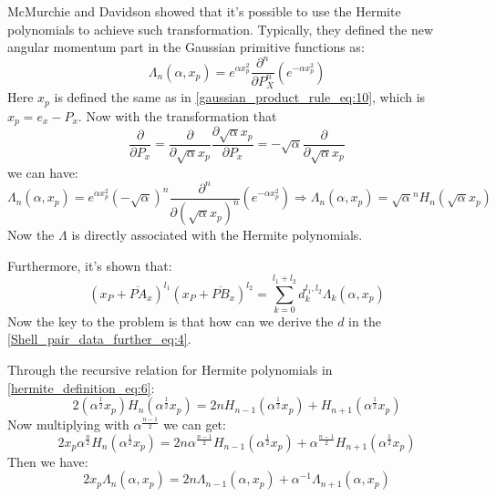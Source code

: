 McMurchie and Davidson showed that\cite{MD} it's possible to use the
Hermite polynomials to achieve such transformation. Typically, they defined the
new angular momentum part in the Gaussian primitive functions as:
\begin{equation}
 \label{Shell_pair_data_further_eq:1}
\Lambda_{n}(\alpha, x_{p}) = e^{\alpha x_{p}^{2}} \frac{\partial^{n}}{\partial
P_{X}^{n}}\left( e^{-\alpha x_{p}^{2}} \right) 
\end{equation}
Here $x_{p}$ is defined the same as in \ref{gaussian_product_rule_eq:10}, which
is $x_{p} = e_{x} - P_{x}$. Now with the transformation that
\begin{equation}
 \label{Shell_pair_data_further_eq:2}
\frac{\partial}{\partial P_{x}} =
\frac{\partial}{\partial \sqrt{\alpha}x_{p}}\frac{\partial \sqrt{\alpha}x_{p}
}{\partial P_{x}} = -\sqrt{\alpha} \frac{\partial}{\partial \sqrt{\alpha}x_{p}}
\end{equation}
we can have:
\begin{equation}
 \label{Shell_pair_data_further_eq:3}
\Lambda_{n}(\alpha, x_{p}) = e^{\alpha x_{p}^{2}} (-\sqrt{\alpha})^{n}
 \frac{\partial^{n}}{\partial (\sqrt{\alpha}x_{p})^{n}}\left( e^{-\alpha
x_{p}^{2}} \right) \Rightarrow \Lambda_{n}(\alpha, x_{p}) =
\sqrt{\alpha}^{n}H_{n}(\sqrt{\alpha}x_{p})
\end{equation}
Now the $\Lambda$ is directly associated with the Hermite polynomials.

Furthermore, it's shown that:
\begin{equation}
 \label{Shell_pair_data_further_eq:4}
(x_{P} +\overline{PA}_{x})^{l_{1}}(x_{P} + \overline{PB}_{x})^{l_{2}}
= \sum^{l_{1}+l_{2}}_{k=0}d^{l_{1},l_{2}}_{k}\Lambda_{k}(\alpha, x_{p})
\end{equation}
Now the key to the problem is that how can we derive the $d$ in the 
\ref{Shell_pair_data_further_eq:4}.

Through the recursive relation for Hermite polynomials in
\ref{hermite_definition_eq:6}:
\begin{equation}
\label{Shell_pair_data_further_eq:5}
 2(\alpha^{\frac{1}{2}}x_{p})H_{n}(\alpha^{\frac{1}{2}}x_{p}) =
2nH_{n-1}(\alpha^{\frac{1}{2}}x_{p}) + H_{n+1}(\alpha^{\frac{1}{2}}x_{p})
\end{equation}
Now multiplying with $\alpha^{\frac{n-1}{2}}$ we can get:
\begin{equation}
 \label{Shell_pair_data_further_eq:6}
2x_{p}\alpha^{\frac{n}{2}}H_{n}(\alpha^{\frac{1}{2}}x_{p}) =
2n\alpha^{\frac{n-1}{2}}H_{n-1}(\alpha^{\frac{1}{2}}x_{p}) +
\alpha^{\frac{n-1}{2}}H_{n+1}(\alpha^{\frac{1}{2}}x_{p})
\end{equation}
Then we have:
\begin{equation}
 \label{Shell_pair_data_further_eq:7}
2x_{p}\Lambda_{n}(\alpha,x_{p}) = 2n\Lambda_{n-1}(\alpha,x_{p}) +
\alpha^{-1}\Lambda_{n+1}(\alpha,x_{p})
\end{equation}

